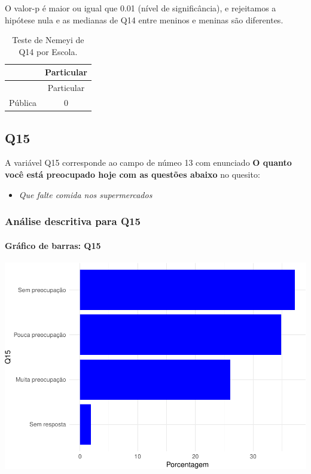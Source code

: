 \documentclass[]{article}
\providecommand{\tightlist}{%
  \setlength{\itemsep}{0pt}\setlength{\parskip}{0pt}}
\let\oldparagraph\paragraph
\renewcommand{\paragraph}[1]{\oldparagraph{#1}\mbox{}}
\begin{document}
O valor-p é maior ou igual que 0.01 (nível de significância), e rejeitamos a hipótese nula e as medianas de Q14 entre meninos e meninas são diferentes.

\begin{longtable}[]{@{}lc@{}}
\caption{\label{tab:unnamed-chunk-61}Teste de Nemeyi de Q14 por Escola.}\tabularnewline
\toprule
& Particular\tabularnewline
\midrule
\endfirsthead
\toprule
& Particular\tabularnewline
\midrule
\endhead
Pública & 0\tabularnewline
\bottomrule
\end{longtable}

\cleardoublepage

\hypertarget{q15}{%
\subsection{Q15}\label{q15}}

A variável Q15 corresponde ao campo de númeo 13 com enunciado \textbf{O quanto você está preocupado hoje com as questões abaixo} no quesito:

\begin{itemize}
\tightlist
\item
  \emph{Que falte comida nos supermercados}
\end{itemize}

\hypertarget{anuxe1lise-descritiva-para-q15}{%
\subsubsection{Análise descritiva para Q15}\label{anuxe1lise-descritiva-para-q15}}

\hypertarget{gruxe1fico-de-barras-q15}{%
\paragraph{Gráfico de barras: Q15}\label{gruxe1fico-de-barras-q15}}

\begin{center}\includegraphics[width=0.75\linewidth]{relatorio_covid19_files/figure-latex/unnamed-chunk-68-1} \end{center}
\end{document}
